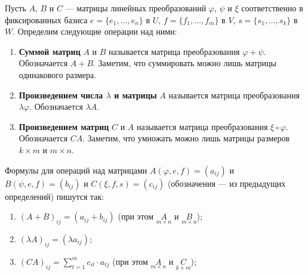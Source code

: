\begin{definition}
    Пусть $A$, $B$ и $C$ --- матрицы линейных преобразований $\varphi$, $\psi$ и $\xi$ соответственно в фиксированных базиса $e = \{e_1, \ldots, e_n\}$ в $U$, $f = \{f_1, \ldots, f_m\}$ в $V$, $s = \{s_1, \ldots, s_k\}$ в $W$. Определим следующие операции над ними:
    \begin{enumerate}
        \item \textbf{Суммой матриц} $A$ и $B$ называется матрица преобразования $\varphi + \psi$. Обозначается $A + B$. Заметим, что суммировать можно лишь матрицы одинакового размера.
        \item \textbf{Произведением числа $\lambda$ и матрицы} $A$ называется матрица преобразования $\lambda\varphi$. Обозначается $\lambda A$.
        \item \textbf{Произведением матриц} $C$ и $A$ называется матрица преобразования $\xi \circ \varphi$. Обозначается $CA$. Заметим, что умножать можно лишь матрицы размеров $k \times m$ и $m \times n$.
    \end{enumerate}
\end{definition}

\begin{statement}
    Формулы для операций над матрицами $A(\varphi, e, f) = (a_{ij})$ и $B(\psi, e, f) = (b_{ij})$ и $C(\xi, f, s) = (c_{ij})$ (обозначения --- из предыдущих определений) пишутся так:
    \begin{enumerate}[nolistsep]
        \item $(A + B)_{ij} = (a_{ij} + b_{ij})$ (при этом $\underset{m \times n}{A}$ и $\underset{m \times n}{B}$);
        \item $(\lambda A)_{ij} = (\lambda a_{ij})$;
        \item $\displaystyle (CA)_{ij} = \sum_{t = 1}^m c_{it}\cdot a_{tj}$ (при этом $\underset{m \times n}{A}$ и $\underset{k \times m}{C}$);
    \end{enumerate}
\end{statement}

